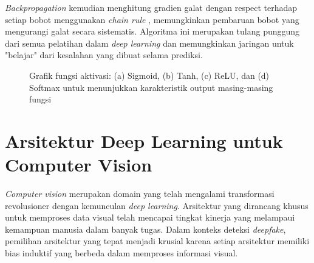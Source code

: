 \textit{Backpropagation} kemudian menghitung gradien galat dengan respect terhadap setiap bobot menggunakan \textit{chain rule} \cite{rumelhart1986learning}, memungkinkan pembaruan bobot yang mengurangi galat secara sistematis. Algoritma ini merupakan tulang punggung dari semua pelatihan dalam \textit{deep learning} dan memungkinkan jaringan untuk "belajar" dari kesalahan yang dibuat selama prediksi.

\begin{figure}[H]
    \centering
    \caption{ Grafik fungsi aktivasi: (a) Sigmoid, (b) Tanh, (c) ReLU, dan (d) Softmax untuk
menunjukkan karakteristik output masing-masing fungsi}
    \label{fig:activation_graph}
\end{figure}

\section{Arsitektur Deep Learning untuk Computer Vision}

\textit{Computer vision} merupakan domain yang telah mengalami transformasi revolusioner dengan kemunculan \textit{deep learning}. Arsitektur yang dirancang khusus untuk memproses data visual telah mencapai tingkat kinerja yang melampaui kemampuan manusia dalam banyak tugas. Dalam konteks deteksi \textit{deepfake}, pemilihan arsitektur yang tepat menjadi krusial karena setiap arsitektur memiliki bias induktif yang berbeda dalam memproses informasi visual.

